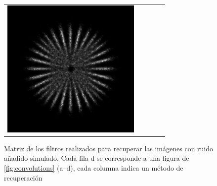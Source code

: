 \documentclass{./packages/optica-article}
\begin{document}
\begin{figure}[hbp]
\begin{tabular}[t]{l c c c c}
		\includegraphics[scale=0.25]{Simulation deconvolution/ref_np_0.01/RL_50.png}
		\\
	\end{tabular}
	\caption{Matriz de los filtros realizados para recuperar las imágenes con ruido añadido simulado. Cada fila d se corresponde a una figura de \ref{fig:convolutions} (a--d), cada columna indica un método de recuperación}
\end{figure}


\end{document}
